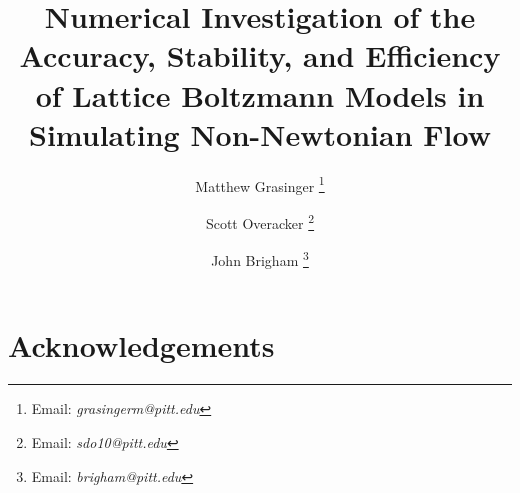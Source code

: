 \documentclass{article}
\title{Numerical Investigation of the Accuracy, Stability, and Efficiency of Lattice Boltzmann Models in Simulating Non-Newtonian Flow}
\author{{Matthew Grasinger}
\thanks{Email: \textit{grasingerm@pitt.edu}}}
\author{{Scott Overacker}
\thanks{Email: \textit{sdo10@pitt.edu}}}
\author{John Brigham
\thanks{Email: \textit{brigham@pitt.edu}}}
\affil{Civil and Environmental Engineering Department, University of Pittsburgh}
\begin{document}
\maketitle
\newpage
{}



\section*{Acknowledgements}




	
\end{document}
